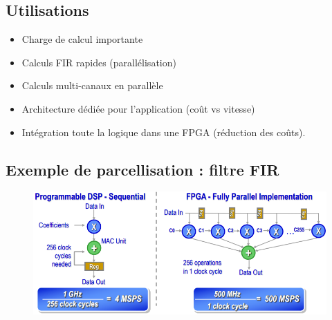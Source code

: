 \documentclass[resume]{subfiles}
\begin{document}
\subsection{Utilisations}
\begin{itemize}
\item Charge de calcul importante
\item Calculs FIR rapides (parallélisation)
\item Calculs multi-canaux en parallèle
\item Architecture dédiée pour l'application (coût vs vitesse)
\item Intégration toute la logique dans une FPGA (réduction des coûts).
\end{itemize}

\subsection{Exemple de parcellisation : filtre FIR}
\begin{figure}[H]
\centering
\includegraphics[width=\columnwidth]{img_3.png}
\end{figure}
\end{document}
